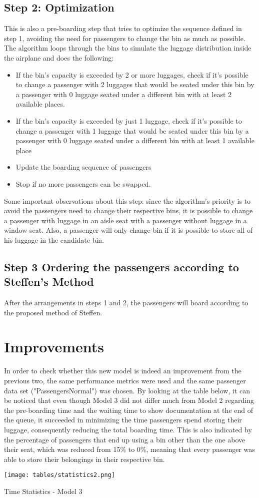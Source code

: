 \subsection{Step 2: Optimization}
This is also a pre-boarding step that tries to optimize the sequence defined in step 1, avoiding the need for passengers to change the bin as much as possible. The algorithm loops through the bins to simulate the luggage distribution inside the airplane and does the following:
\indent \newline
\begin{itemize}
\item If the bin's capacity is exceeded by 2 or more luggages, check if it's possible to change a passenger with 2 luggages that would be seated under this bin by a passenger with 0 luggage seated under a different bin with at least 2 available places.
\item If the bin's capacity is exceeded by just 1 luggage, check if it's possible to change  a passenger with 1 luggage that would be seated under this bin by a passenger with 0 luggage seated under a different bin with at least 1 available place
\item Update the boarding sequence of passengers 
\item Stop if no more passengers can be swapped.
\end{itemize}

\indent \newline
Some important observations about this step: since the algorithm's priority is to avoid the passengers need to change their respective bins, it is possible to change a passenger with luggage in an aisle seat with a passenger without luggage in a window seat. Also, a passenger will only change bin if it is possible to store all of his luggage in the candidate bin. 

\subsection{Step 3 Ordering the passengers according to Steffen’s Method}
After the arrangements in steps 1 and 2, the passengers will board according to the proposed method of Steffen.

\section{Improvements}
In order to check whether this new model is indeed an improvement from the previous two, the same performance metrics were used and the same passenger data set ("PassengersNormal") was chosen. By looking at the table below, it can be noticed that even though Model 3 did not differ much from Model 2 regarding the pre-boarding time and the waiting time to show documentation at the end of the queue, it succeeded in minimizing the time passengers spend storing their luggage, consequently reducing the total boarding time. This is also indicated by the percentage of passengers that end up using a bin other than the one above their seat, which was reduced from 15\% to 0\%, meaning that every passenger was able to store their belongings in their respective bin.


\begin{table}[H]
  \texttt{[image: tables/statistics2.png]}
  \caption{Time Statistics - Model 3}
  \label{tbl:statistics2}
\end{table}
